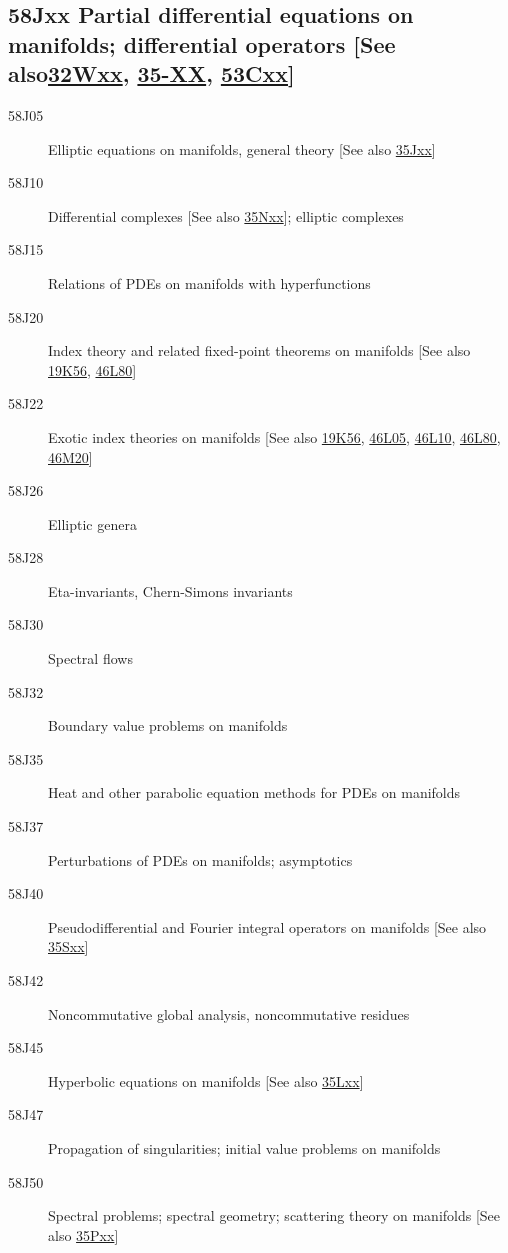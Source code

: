 \documentclass[letterpaper]{article}
\begin{document}
\subsection*{58Jxx  Partial differential equations on manifolds; differential operators [See also\newline \hyperref[32Wxx]{32Wxx}, \hyperref[35-XX]{35-XX}, \hyperref[53Cxx]{53Cxx}] }\label{58Jxx}
\begin{description}  
\item [58J05]\label{58J05} Elliptic equations on manifolds, general theory [See also \hyperref[35Jxx]{35Jxx}]
\item [58J10]\label{58J10} Differential complexes [See also \hyperref[35Nxx]{35Nxx}]; elliptic complexes
\item [58J15]\label{58J15} Relations of PDEs on manifolds with hyperfunctions
\item [58J20]\label{58J20} Index theory and related fixed-point theorems on manifolds [See also \hyperref[19K56]{19K56}, \hyperref[46L80]{46L80}]
\item [58J22]\label{58J22} Exotic index theories on manifolds [See also \hyperref[19K56]{19K56}, \hyperref[46L05]{46L05}, \hyperref[46L10]{46L10}, \hyperref[46L80]{46L80}, \hyperref[46M20]{46M20}]
\item [58J26]\label{58J26} Elliptic genera
\item [58J28]\label{58J28} Eta-invariants, Chern-Simons invariants
\item [58J30]\label{58J30} Spectral flows
\item [58J32]\label{58J32} Boundary value problems on manifolds
\item [58J35]\label{58J35} Heat and other parabolic equation methods for PDEs on manifolds
\item [58J37]\label{58J37} Perturbations of PDEs on manifolds; asymptotics
\item [58J40]\label{58J40} Pseudodifferential and Fourier integral operators on manifolds [See also \hyperref[35Sxx]{35Sxx}]
\item [58J42]\label{58J42} Noncommutative global analysis, noncommutative residues
\item [58J45]\label{58J45} Hyperbolic equations on manifolds [See also \hyperref[35Lxx]{35Lxx}]
\item [58J47]\label{58J47} Propagation of singularities; initial value problems on manifolds
\item [58J50]\label{58J50} Spectral problems; spectral geometry; scattering theory on manifolds [See also \hyperref[35Pxx]{35Pxx}]

\end{description}
\end{document}
